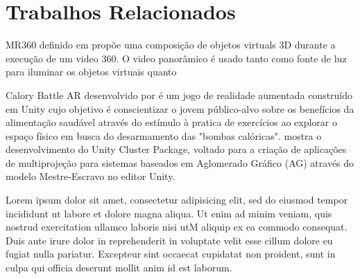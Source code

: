 \section{Trabalhos Relacionados}






MR360 definido em \cite{rhee2017mr360} propõe uma composição de objetos virtuals 3D durante a execução de um video 360. O video panorâmico é usado tanto como fonte de luz para iluminar os objetos virtuais quanto


Calory Battle AR desenvolvido por \cite{kim2014using} é um jogo de realidade aumentada construído em Unity cujo objetivo é conscientizar o jovem público-alvo sobre os benefícios da alimentação saudável através do estímulo à pratica de exercícios ao explorar o espaço físico em busca do desarmamento das "bombas calóricas".
\cite{sv2015popolin} mostra o desenvolvimento do Unity Cluster Package, voltado para a criação de aplicações de multiprojeção para sistemas baseados em Aglomerado Gráfico (AG) através do modelo Mestre-Escravo no editor Unity.



Lorem ipsum dolor sit amet, consectetur adipisicing elit, sed do eiusmod
tempor incididunt ut labore et dolore magna aliqua. Ut enim ad minim veniam,
quis nostrud exercitation ullamco laboris nisi utM aliquip ex ea commodo
consequat. Duis aute irure dolor in reprehenderit in voluptate velit esse
cillum dolore eu fugiat nulla pariatur. Excepteur sint occaecat cupidatat non
proident, sunt in culpa qui officia deserunt mollit anim id est laborum.
